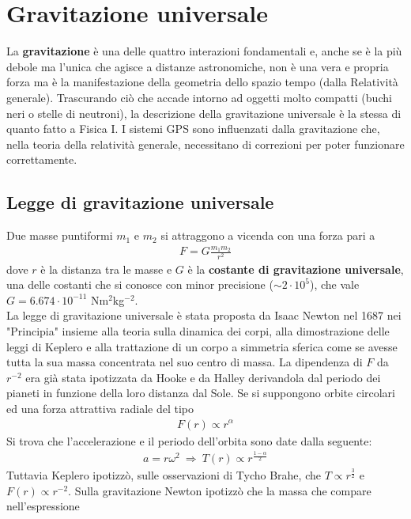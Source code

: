 \documentclass[a4paper, oneside]{book}
\begin{document}
\chapter{Gravitazione universale}
La \textbf{gravitazione} è una delle quattro interazioni fondamentali e, anche se è la più debole ma l'unica 
che agisce a distanze astronomiche, non è una vera e propria forza ma è 
la manifestazione della geometria dello spazio tempo (dalla Relatività generale). Trascurando 
ciò che accade intorno ad oggetti molto compatti (buchi neri o stelle di neutroni),
la descrizione della gravitazione universale è la stessa di quanto fatto a Fisica I. 
I sistemi GPS sono influenzati dalla gravitazione che, nella teoria della relatività 
generale, necessitano di correzioni per poter funzionare correttamente.

\section{Legge di gravitazione universale}
Due masse puntiformi $m_1$ e $m_2$ si attraggono a vicenda con una 
forza pari a
\begin{align}
    F = G\frac{m_1 m_2}{r^{2}}
\end{align}
dove $r$ è la distanza tra le masse e $G$ è la \textbf{costante di gravitazione 
universale}, una delle costanti che si conosce con minor precisione ($\sim 2 \cdot 10^{5}$), 
che vale $ G= 6.674 \cdot 10^{-11}$ Nm$^{2}$kg$^{-2}$. \\
La legge di gravitazione universale è stata proposta da Isaac Newton nel 1687 nei "Principia"
insieme alla teoria sulla dinamica dei corpi, alla dimostrazione delle leggi di Keplero
e alla trattazione di un corpo a simmetria sferica come se avesse tutta la sua massa concentrata
nel suo centro di massa. La dipendenza di $F$ da $r^{-2}$ era già stata ipotizzata da Hooke e
da Halley derivandola dal periodo dei pianeti in funzione della loro distanza dal Sole.
Se si suppongono orbite circolari ed una forza attrattiva radiale del tipo 
\begin{align}
    F(r) \propto r^{\alpha}
\end{align}
Si trova che l'accelerazione e il periodo dell'orbita sono date dalla seguente:
\begin{gather*}
    a = r\omega^{2} \ \Longrightarrow \ T(r) \propto r^{\frac{1-\alpha}{2}}
\end{gather*}
Tuttavia Keplero ipotizzò, sulle osservazioni di Tycho Brahe, che $T\propto r^{\frac{3}{2}}$ e $F(r) \propto r^{-2}$.
Sulla gravitazione Newton ipotizzò che la massa che compare nell'espressione 
\end{document}
